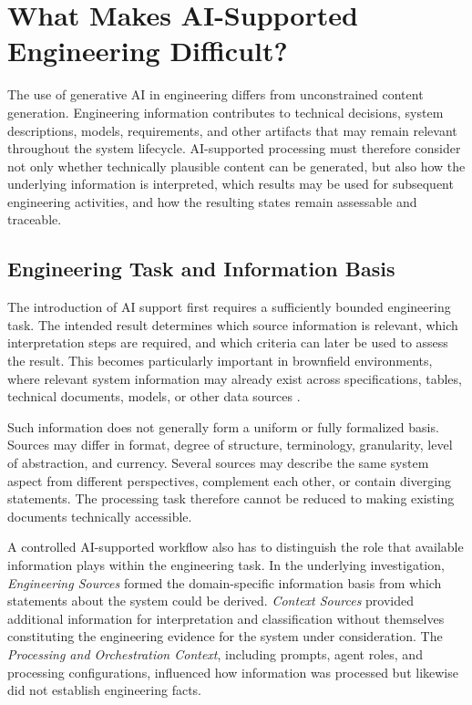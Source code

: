 \section{What Makes AI-Supported Engineering Difficult?}
\label{sec:challenges}

The use of generative AI in engineering differs from unconstrained content generation.
Engineering information contributes to technical decisions, system descriptions, models,
requirements, and other artifacts that may remain relevant throughout the system lifecycle.
AI-supported processing must therefore consider not only whether technically plausible
content can be generated, but also how the underlying information is interpreted, which
results may be used for subsequent engineering activities, and how the resulting states
remain assessable and traceable.

\subsection{Engineering Task and Information Basis}
\label{sec:challenge_information_basis}

The introduction of AI support first requires a sufficiently bounded engineering task.
The intended result determines which source information is relevant, which interpretation
steps are required, and which criteria can later be used to assess the result. This becomes
particularly important in brownfield environments, where relevant system information may
already exist across specifications, tables, technical documents, models, or other data
sources \cite{Maheshwari2018,Henderson2024}.

Such information does not generally form a uniform or fully formalized basis. Sources may
differ in format, degree of structure, terminology, granularity, level of abstraction, and
currency. Several sources may describe the same system aspect from different perspectives,
complement each other, or contain diverging statements. The processing task therefore
cannot be reduced to making existing documents technically accessible.

A controlled AI-supported workflow also has to distinguish the role that available
information plays within the engineering task. In the underlying investigation,
\emph{Engineering Sources} formed the domain-specific information basis from which
statements about the system could be derived. \emph{Context Sources} provided additional
information for interpretation and classification without themselves constituting the
engineering evidence for the system under consideration. The \emph{Processing and
Orchestration Context}, including prompts, agent roles, and processing configurations,
influenced how information was processed but likewise did not establish engineering facts.

